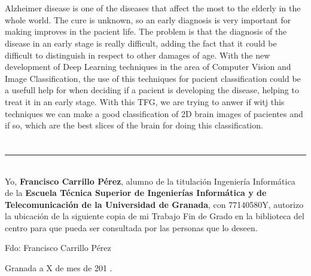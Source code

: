 \\

\vspace{0.7cm}
\\

Alzheimer disease is one of the diseases that affect the most to the elderly in the whole world. The cure is unknown, so an early diagnosis is very important for making improves in the pacient life. The problem is that the diagnosis of the disease in an early stage is really difficult, adding the fact that it could be difficult to distinguish in respect to other damages of age. With the new development of Deep Learning techniques in the area of Computer Vision and Image Classification, the use of this techniques for pacient classification could be a usefull help for when deciding if a pacient is developing the disease, helping to treat it in an early stage. With this TFG, we are trying to anwer if witj this techniques we can make a good classification of 2D brain images of pacientes and if so, which are the best slices of the brain for doing this classification.
\chapter*{}
\thispagestyle{empty}

\noindent\rule[-1ex]{\textwidth}{2pt}\\[4.5ex]

Yo, \textbf{Francisco Carrillo Pérez}, alumno de la titulación Ingeniería Informática de la \textbf{Escuela Técnica Superior
de Ingenierías Informática y de Telecomunicación de la Universidad de Granada}, con 77140580Y, autorizo la
ubicación de la siguiente copia de mi Trabajo Fin de Grado en la biblioteca del centro para que pueda ser
consultada por las personas que lo deseen.

\vspace{6cm}

\noindent Fdo: Francisco Carrillo Pérez

\vspace{2cm}

\begin{flushright}
Granada a X de mes de 201 .
\end{flushright}


\chapter*{}
\thispagestyle{empty}

